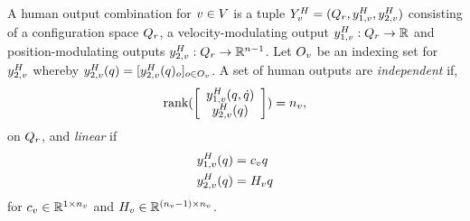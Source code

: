 \begin{mydefinition}
A human output combination for $v \in V$ is a tuple $Y_{v}^H = (Q_r,y_{1,v}^H,y_{2,v}^H)$ consisting of a configuration space $Q_r$, a velocity-modulating output $y_{1,v}^H : Q_r \to \mathbb{R}$ and position-modulating outputs $y_{2,v}^H : Q_r \to \mathbb{R}^{n-1}$. Let $O_v$ be an indexing set for $y_{2,v}^H$ whereby $y_{2,v}^H(q) = [y_{2,v}^H(q)_o]_{o \in O_v}$. A set of human outputs are \textit{independent} if,
 \begin{align}
  \text{rank}( \left[
    \begin{array}{c} y_{1,v}^H(q,\dot {q}) \\
                     y_{2,v}^H(q)
    \end{array}
    \right]) = n_v,
 \end{align}
on $Q_r$, and \textit{linear} if
\begin{align}
 y_{1,v}^H(q) &= c_v q \\
 y_{2,v}^H(q) &= H_v q
\end{align}
for $c_v \in \mathbb{R}^{1 \times n_v}$ and $H_v \in \mathbb{R}^{(n_v-1) \times n_v}$.
\end{mydefinition}

\gap

